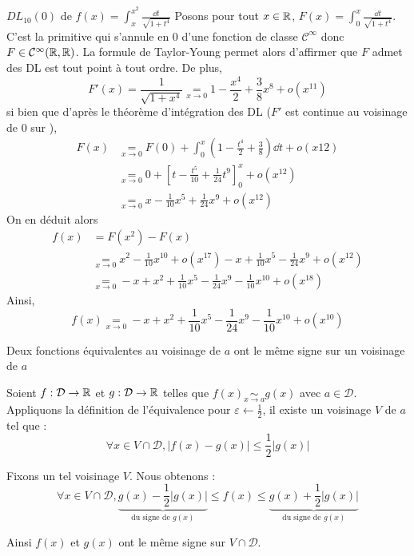 \documentclass{article}
\begin{document}
\begin{question_kholle}{$DL_{10}(0)$ de $f(x)=\displaystyle\int_{x}^{x^{2}}\frac{\dd t}{\sqrt{1+t^{4}}}$}
	Posons pour tout $x\in\mathbb R$, $F(x)=\int_{0}^{x}\frac{\dd t}{\sqrt{1+t^{4}}}$. C’est la primitive qui s’annule en $0$ d’une fonction de classe $\mathcal{C}^{\infty}$ donc $F\in \mathcal{C}^{\infty}(\mathbb R, \mathbb R)$. La formule de Taylor-Young permet alors d’affirmer que $F$ admet des DL est tout point à tout ordre. De plus,
	\[
		F'(x) = \frac{1}{\sqrt{1+x^{4}}} \underset{x\to 0}{=} 1-\frac{x^{4}}{2} + \frac{3}{8}x^{8}+o(x^{11})
	\]
	si bien que d’après le théorème d’intégration des DL ($F'$ est continue au voisinage de 0 sur \R),
	\begin{align*}
		F(x) & \underset{x\to 0}{=} F(0)+\int_{0}^{x}\left(1-\frac{t^{4}}{2}+\frac{3}{8}\right)\dd t + o(x{12}) \\
		     & \underset{x\to 0}{=} 0+\left[t-\frac{t^{5}}{10} + \frac{1}{24}t^{9}\right]_{0}^{x} + o(x^{12})   \\
		     & \underset{x\to 0}{=} x-\frac{1}{10}x^{5} + \frac{1}{24}x^{9} + o(x^{12})
	\end{align*}
	On en déduit alors
	\begin{align*}
		f(x) & = F(x^{2}) - F(x)                                                                                              \\
		     & \underset{x\to 0}{=} x^{2}-\frac{1}{10}x^{10} + o(x^{17}) - x+\frac{1}{10}x^{5} -\frac{1}{24}x^{9} + o(x^{12}) \\
		     & \underset{x\to 0}{=} -x+x^{2}+\frac{1}{10}x^{5}-\frac{1}{24}x^{9}-\frac{1}{10}x^{10}+o(x^{18})
	\end{align*}
	Ainsi,
	\[
		f(x)\underset{x\to 0}{=} -x+x^{2}+\frac{1}{10}x^{5} - \frac{1}{24}x^{9} - \frac{1}{10}x^{10} + o(x^{10})
	\]
\end{question_kholle}

\begin{question_kholle}
	{Deux fonctions équivalentes au voisinage de $a$ ont le même signe sur un voisinage de $a$}

	Soient $f : \mathcal{D} \rightarrow \mathbb R$ et $g : \mathcal{D} \rightarrow \mathbb R$ telles que $f(x) \underset{x \rightarrow a}{\sim} g(x)$ avec $a \in \mathcal{D}$. \\
	Appliquons la définition de l'équivalence pour $\varepsilon \leftarrow \frac{1}{2}$, il existe un voisinage $V$ de $a$ tel que :
	\begin{equation*}
		\forall x \in V \cap \mathcal{D},
		| f(x) - g(x) | \leqslant \frac{1}{2} | g(x) |
	\end{equation*}

	Fixons un tel voisinage $V$.
	Nous obtenons :
	\begin{equation*}
		\forall x \in V \cap \mathcal{D},
		\underbrace{g(x) - \frac{1}{2} | g(x) |}_{\text{du signe de }g(x)}
		\leqslant f(x) \leqslant
		\underbrace{g(x) + \frac{1}{2} | g(x) |}_{\text{du signe de }g(x)}
	\end{equation*}

	Ainsi $f(x)$ et $g(x)$ ont le même signe sur $V \cap \mathcal{D}$.
\end{question_kholle}
\end{document}
